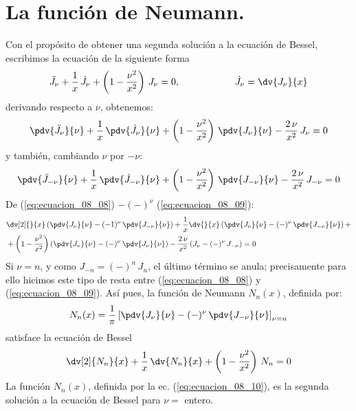 \section{La función de Neumann.}
Con el propósito de obtener una segunda solución a la ecuación de Bessel, escribimos la ecuación de la siguiente forma
\[ \ddot{J}_{\nu} + \dfrac{1}{x} \, \dot{J}_{\nu}  + \left( 1 - \dfrac{\nu^{2}}{x^{2}} \right) \, J_{\nu} = 0, \hspace{2cm} \dot{J}_{\nu} =  \dv{J_{\nu}}{x} \]
derivando respecto a $\nu$, obtenemos:
\begin{equation}
\pdv{\ddot{J}_{\nu}}{\nu} + \dfrac{1}{x} \, \pdv{\dot{J}_{\nu}}{\nu} + \left( 1 - \dfrac{\nu^{2}}{x^{2}} \right) \, \pdv{J_{\nu}}{\nu} - \dfrac{2  \, \nu}{x^{2}} \, J_{\nu} = 0
\label{eq:ecuacion_08_08} 
\end{equation}
y también, cambiando $\nu$ por $-\nu$:
\begin{equation}
\pdv{\ddot{J}_{-\nu}}{\nu} + \dfrac{1}{x} \, \pdv{\dot{J}_{-\nu}}{\nu} + \left( 1 - \dfrac{\nu^{2}}{x^{2}} \right) \, \pdv{J_{-\nu}}{\nu} - \dfrac{2 \, \nu}{x^{2}} \, J_{-\nu} = 0
\label{eq:ecuacion_08_09} 
\end{equation}
De (\ref{eq:ecuacion_08_08}) $-(-)^{\nu}$ (\ref{eq:ecuacion_08_09}):
\begin{align*}
&\dv[2]{}{x} \left( \pdv{J_{\nu}}{\nu} - (-1)^{\nu} \, \pdv{J_{-\nu}}{\nu} \right) + \dfrac{1}{x} \dv{}{x} \left( \pdv{J_{\nu}}{\nu} - (-)^{\nu} \,\pdv{J_{-\nu}}{\nu} \right) + \\
&+ \left( 1 - \dfrac{\nu^{2}}{x^{2}} \right) \left( \pdv{J_{\nu}}{\nu} - (-)^{\nu}  \, \pdv{J_{\nu}}{\nu} \right) - \dfrac{2 \, \nu}{x^{2}} \, (J_{\nu} - (-)^{\nu} \, J_{-\nu}) = 0
\end{align*}
Si $\nu = n$, y como $J_{-n} = (-)^{n} \, J_{n}$, el último término se anula; precisamente para ello hicimos este tipo de resta entre (\ref{eq:ecuacion_08_08}) y (\ref{eq:ecuacion_08_09}). Así pues, la función de Neumann $N_{n}(x)$, definida por:
\begin{equation}
N_{n} (x) = \dfrac{1}{\pi} \left[ \pdv{J_{\nu}}{\nu} - (-)^{\nu} \, \pdv{J_{-\nu}}{\nu} \right]_{\nu = n}
\label{eq:ecuacion_08_10}
\end{equation}
satisface la ecuación de Bessel
\[ \dv[2]{N_{n}}{x} + \dfrac{1}{x} \, \dv{N_{n}}{x} + \left( 1 - \dfrac{\nu^{2}}{x^{2}} \right) \, N_{n} = 0\]
La función $N_{n}(x)$, definida por la ec. (\ref{eq:ecuacion_08_10}), es la segunda solución a la ecuación de Bessel para $\nu =$ entero.
\par
